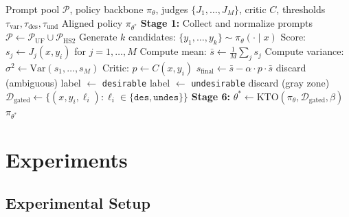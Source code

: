 \documentclass[10pt,twocolumn]{article}
\newcommand{\ours}{\textsc{DMAPO}}
\begin{document}
\begin{algorithm}[t]
\caption{\ours{} Pipeline}
\label{alg:pipeline}
\begin{algorithmic}[1]
\Require Prompt pool $\mathcal{P}$, policy backbone $\pi_\theta$, judges $\{J_1, \ldots, J_M\}$, critic $C$, thresholds $\tau_\text{var}, \tau_\text{des}, \tau_\text{und}$
\Ensure Aligned policy $\pi_{\theta^*}$
\State \textbf{Stage 1:} Collect and normalize prompts $\mathcal{P} \leftarrow \mathcal{P}_\text{UF} \cup \mathcal{P}_\text{HS2}$
 
  \State Generate $k$ candidates: $\{y_1, \ldots, y_k\} \sim \pi_\theta(\cdot \mid x)$
\EndFor
{} 
  \State Score: $s_j \leftarrow J_j(x, y_i)$ for $j = 1, \ldots, M$
  \State Compute mean: $\bar{s} \leftarrow \frac{1}{M}\sum_j s_j$
  \State Compute variance: $\sigma^2 \leftarrow \text{Var}(s_1, \ldots, s_M)$
\EndFor
{} 
  \State Critic: $p \leftarrow C(x, y_i)$ 
  \State $s_\text{final} \leftarrow \bar{s} - \alpha \cdot p \cdot \bar{s}$
\EndFor
{} 
   discard (ambiguous)
   label $\leftarrow$ \texttt{desirable}
   label $\leftarrow$ \texttt{undesirable}
  \Else{} discard (gray zone)
  \EndIf
\EndFor
\State $\mathcal{D}_\text{gated} \leftarrow \{(x, y_i, \ell_i) : \ell_i \in \{\texttt{des}, \texttt{undes}\}\}$
\State \textbf{Stage 6:} $\theta^* \leftarrow \text{KTO}(\pi_\theta, \mathcal{D}_\text{gated}, \beta)$ 
\State \Return $\pi_{\theta^*}$
\end{algorithmic}
\end{algorithm}


%
%

\section{Experiments}
\label{sec:experiments}

\subsection{Experimental Setup}
\label{sec:setup}
\end{document}
